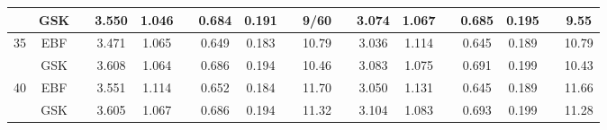 \documentclass[11pt]{article}
\begin{document}
\begin{landscape}
\begin{table}[htbp]
\begin{tabular}{cc c cc c cc c c c cc c cc c c}
         & GSK && 3.550 & 1.046 && 0.684 & 0.191 && 9/60 && 3.074 & 1.067 && 0.685 & 0.195 && 9.55\\
  \midrule
  35 & EBF && 3.471 & 1.065 && 0.649 & 0.183 && 10.79 && 3.036 & 1.114 && 0.645 & 0.189 && 10.79\\
         & GSK && 3.608 & 1.064 && 0.686 & 0.194 && 10.46 && 3.083 & 1.075 && 0.691 & 0.199 && 10.43\\
  \midrule
  40 & EBF && 3.551 & 1.114 && 0.652 & 0.184 && 11.70 && 3.050 & 1.131 && 0.645 & 0.189 && 11.66\\
         & GSK && 3.605 & 1.067 && 0.686 & 0.194 && 11.32 && 3.104 & 1.083 && 0.693 & 0.199 && 11.28\\
  \bottomrule
  \end{tabular}
\end{table}
\end{landscape}


\end{document}
